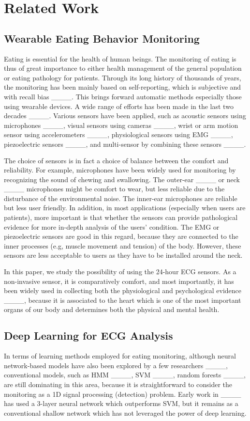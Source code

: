 \section{Related Work}
\subsection{Wearable Eating Behavior Monitoring}
	Eating is essential for the health of human beings. The monitoring of eating is thus of great importance to either health management of the general population or eating pathology for patients. Through its long history of thousands of years, the monitoring has been mainly based on self-reporting, which is subjective and with recall bias ____. This brings forward automatic methods especially those using wearable devices. 
	A wide range of efforts has been made in the last two decades ____. Various sensors have been applied, such as acoustic sensors using microphones ____, visual sensors using cameras ____, wrist or arm motion sensor using accelerometers ____, physiological sensors using EMG ____, piezoelectric sensors ____, and multi-sensor by combining these sensors ____.
	
	The choice of sensors is in fact a choice of balance between the comfort and reliability. For example, microphones have been widely used for monitoring by recognizing the sound of chewing and swallowing. The outer-ear ____ or neck ____ microphones might be comfort to wear, but less reliable due to the disturbance of the environmental noise. The inner-ear microphones are reliable but less user friendly.
	In addition, in most applications (especially when users are patients), more important is that whether the sensors can provide pathological evidence for more in-depth analysis of the users' condition. The EMG or piezoelectric sensors are good in this regard, because they are connected to the inner processes (e.g, muscle movement and tension) of the body. However, these sensors are less acceptable to users as they have to be installed around the neck.
	
	In this paper, we study the possibility of using the 24-hour ECG sensors. As a non-invasive sensor, it is comparatively comfort, and most importantly, it has been widely used in collecting both the
	physiological and psychological evidence ____, because it is associated to the heart which is one of the most important organs of our body and determines both the physical and mental health.
	
	
	\subsection{Deep Learning for ECG Analysis}
	In terms of learning methods employed for eating monitoring, although neural network-based models have also been explored by a few researchers ____, conventional models, such as HMM ____, SVM ____, random forests ____, are still dominating in this area, because it is straightforward to consider the monitoring as a 1D signal processing (detection) problem. Early work in ____ has used a 3-layer neural network 
	which outperforms SVM, but it remains as a conventional shallow network which has not leveraged the power of deep learning.
	
